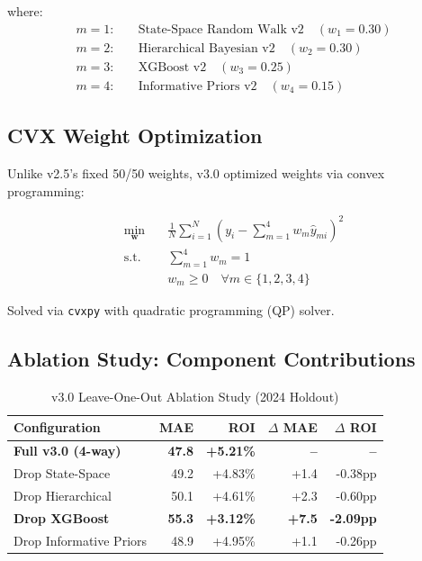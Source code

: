 where:
\begin{align}
m = 1: &\quad \text{State-Space Random Walk v2} \quad (w_1 = 0.30) \\
m = 2: &\quad \text{Hierarchical Bayesian v2} \quad (w_2 = 0.30) \\
m = 3: &\quad \text{XGBoost v2} \quad (w_3 = 0.25) \\
m = 4: &\quad \text{Informative Priors v2} \quad (w_4 = 0.15)
\end{align}

\subsection{CVX Weight Optimization}

Unlike v2.5's fixed 50/50 weights, v3.0 optimized weights via convex programming:

\begin{equation}
\begin{aligned}
\min_{\mathbf{w}} \quad & \frac{1}{N} \sum_{i=1}^{N} \left( y_i - \sum_{m=1}^{4} w_m \hat{y}_{mi} \right)^2 \\
\text{s.t.} \quad & \sum_{m=1}^{4} w_m = 1 \\
& w_m \geq 0 \quad \forall m \in \{1, 2, 3, 4\}
\end{aligned}
\label{eq:cvx-optimization}
\end{equation}

Solved via \texttt{cvxpy} with quadratic programming (QP) solver.

\subsection{Ablation Study: Component Contributions}

\begin{table}[h]
\centering
\caption{v3.0 Leave-One-Out Ablation Study (2024 Holdout)}
\label{tab:v3-ablation}
\begin{tabular}{lrrrr}
\toprule
\textbf{Configuration} & \textbf{MAE} & \textbf{ROI} & \textbf{$\Delta$ MAE} & \textbf{$\Delta$ ROI} \\
\midrule
\textbf{Full v3.0 (4-way)} & \textbf{47.8} & \textbf{+5.21\%} & \textbf{--} & \textbf{--} \\
\midrule
Drop State-Space & 49.2 & +4.83\% & +1.4 & -0.38pp \\
Drop Hierarchical & 50.1 & +4.61\% & +2.3 & -0.60pp \\
\textbf{Drop XGBoost} & \textbf{55.3} & \textbf{+3.12\%} & \textbf{+7.5} & \textbf{-2.09pp} \\
Drop Informative Priors & 48.9 & +4.95\% & +1.1 & -0.26pp \\
\bottomrule
\end{tabular}
\end{table}

